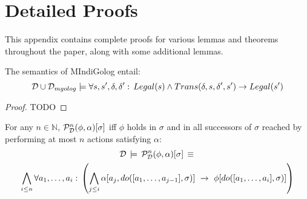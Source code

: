 

\chapter{Detailed Proofs}

\label{ch:proofs}

This appendix contains complete proofs for various lemmas and theorems
throughout the paper, along with some additional lemmas.

\begin{lemmaext}
[{{[}\ref{lem:MIndiGolog:trans_legal}]}] The semantics of MIndiGolog
entail:\[
\mathcal{D}\cup\mathcal{D}_{mgolog}\models\forall s,s',\delta,\delta':\, Legal(s)\wedge Trans(\delta,s,\delta',s')\rightarrow Legal(s')\]

\end{lemmaext}
\begin{proof}
TODO 
\end{proof}
\begin{thmext}
[{\ref{thm:PstN-works}}] For any $n\in\mathbb{N}$, $\mathcal{P}_{\mathcal{D}}^{n}(\phi,\alpha)[\sigma]$
iff $\phi$ holds in $\sigma$ and in all successors of $\sigma$
reached by performing at most $n$ actions satisfying $\alpha$:\begin{multline*}
\mathcal{D}\,\models\,\mathcal{P}_{\mathcal{D}}^{n}(\phi,\alpha)[\sigma]\,\equiv\,\\
\bigwedge_{i\leq n}\forall a_{1},\dots,a_{i}:\,\left(\bigwedge_{j\leq i}\alpha[a_{j},do([a_{1},\dots,a_{j-1}],\sigma)]\,\,\rightarrow\,\,\phi[do([a_{1},\dots,a_{i}],\sigma)]\right)\end{multline*}

\end{thmext}
